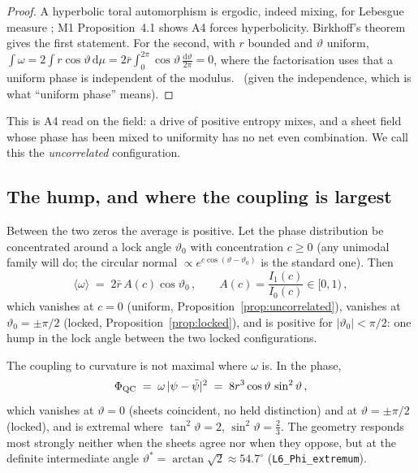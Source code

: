 \begin{proof}
A hyperbolic toral automorphism is ergodic, indeed mixing, for Lebesgue
measure \cite{KatokHasselblatt}; M1 Proposition~4.1 shows A4 forces
hyperbolicity. Birkhoff's theorem gives the first statement. For the
second, with $r$ bounded and $\vartheta$ uniform,
$\int\omega=2\int r\cos\vartheta\,\mathrm{d}\mu=2\bar r\int_{0}^{2\pi}\cos\vartheta\,\tfrac{\mathrm{d}\vartheta}{2\pi}=0$,
where the factorisation uses that a uniform phase is independent of the
modulus. \rigR\ (given the independence, which is what ``uniform phase''
means).
\end{proof}

This is A4 read on the field: a drive of positive entropy mixes, and a
sheet field whose phase has been mixed to uniformity has no net even
combination. We call this the \emph{uncorrelated} configuration.

\subsection{The hump, and where the coupling is largest}\label{sec:hump}

Between the two zeros the average is positive. Let the phase distribution
be concentrated around a lock angle $\vartheta_{0}$ with concentration
$c\ge0$ (any unimodal family will do; the circular normal
$\propto e^{c\cos(\vartheta-\vartheta_{0})}$ is the standard one). Then
\begin{equation}\label{eq:hump}
  \langle\omega\rangle\;=\;2\bar r\,A(c)\cos\vartheta_{0}\,,\qquad
  A(c)=\frac{I_{1}(c)}{I_{0}(c)}\in[0,1)\,,
\end{equation}
which vanishes at $c=0$ (uniform, Proposition~\ref{prop:uncorrelated}),
vanishes at $\vartheta_{0}=\pm\pi/2$ (locked,
Proposition~\ref{prop:locked}), and is positive for
$\lvert\vartheta_{0}\rvert<\pi/2$: one hump in the lock angle between the
two locked configurations. \rigD

The coupling to curvature is not maximal where $\omega$ is. In the phase,
\begin{equation}\label{eq:Phi-phase}
  \Phi_{\mathrm{QC}}\;=\;\omega\,\lvert\psi-\bar\psi\rvert^{2}\;=\;8r^{3}\cos\vartheta\,\sin^{2}\vartheta\,,
\end{equation}
which vanishes at $\vartheta=0$ (sheets coincident, no held distinction)
and at $\vartheta=\pm\pi/2$ (locked), and is extremal where
$\tan^{2}\vartheta=2$, $\sin^{2}\vartheta=\tfrac23$. The geometry responds
most strongly neither when the sheets agree nor when they oppose, but at
the definite intermediate angle $\vartheta^{\ast}=\arctan\sqrt2\approx54.7^{\circ}$
(\texttt{L6\_Phi\_extremum}). \rigR

